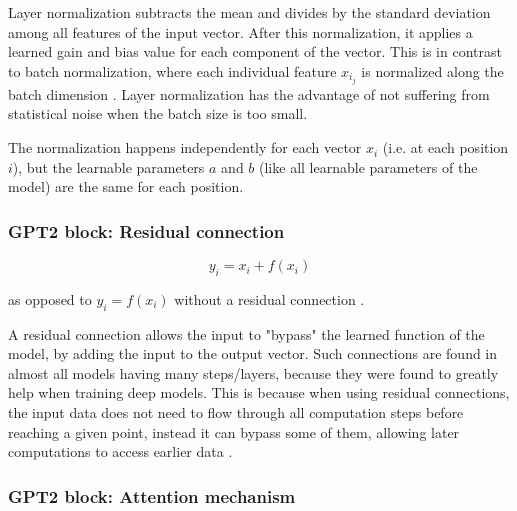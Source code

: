 Layer normalization subtracts the mean and divides by the standard deviation among all features of the input vector.
After this normalization, it applies a learned gain and bias value for each component of the vector.
This is in contrast to batch normalization, where each individual feature $x_{i_j}$ is normalized along the batch dimension .
Layer normalization has the advantage of not suffering from statistical noise when the batch size is too small.

The normalization happens independently for each vector $x_i$ (i.e. at each position $i$), but the learnable parameters $a$ and $b$ (like all learnable parameters of the model) are the same for each position.

\subsubsection{GPT2 block: Residual connection}

\begin{samepage}

$$y_i = x_i + f(x_i)$$

as opposed to $y_i = f(x_i)$ without a residual connection \cite[p. 3]{allyouneed} \cite{residual}.

A residual connection allows the input to "bypass" the learned function of the model, by adding the input to the output vector.
Such connections are found in almost all models having many steps/layers, because they were found to greatly help when training deep models.
This is because when using residual connections, the input data does not need to flow through all computation steps before reaching a given point, instead it can bypass some of them, allowing later computations to access earlier data .

\end{samepage}

\subsubsection{GPT2 block: Attention mechanism}
\label{gpt2_attn}




